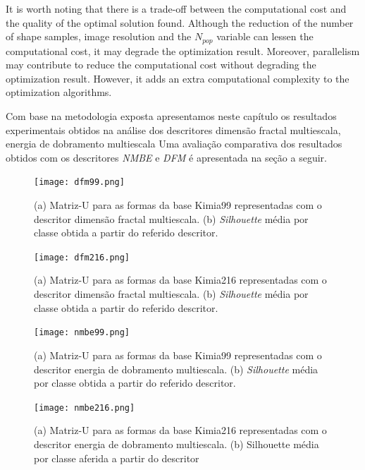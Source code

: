 {It is worth noting that there is a trade-off between the computational cost and the quality of the optimal solution found. Although the reduction of the number of shape samples, image resolution and the $N_{pop}$ variable can lessen the computational cost, it may degrade the optimization result. Moreover, parallelism may contribute to reduce the computational cost without degrading the optimization result.  However, it adds an extra computational complexity to the optimization algorithms.
}





Com base na metodologia exposta apresentamos neste capítulo os resultados experimentais obtidos na análise dos descritores dimensão fractal multiescala, energia de dobramento multiescala Uma avaliação comparativa dos resultados obtidos com os descritores \emph{NMBE} e \emph{DFM} é apresentada na seção a seguir.

\begin{figure}
 \caption{\label{fig:dfm99} (a) Matriz-U para as formas da base Kimia99 representadas com o descritor dimensão fractal multiescala. (b) \textit{Silhouette} média por classe obtida a partir do referido descritor.}
  \centering
  \texttt{[image: dfm99.png]}
\end{figure}

\begin{figure}
 \caption{\label{fig:dfm216} (a) Matriz-U para as formas da base Kimia216 representadas com o descritor dimensão fractal multiescala. (b) \textit{Silhouette} média por classe obtida a partir do referido descritor.}
  \centering
  \texttt{[image: dfm216.png]}
\end{figure}

\begin{figure}
 \caption{\label{fig:nmbe99} (a) Matriz-U para as formas da base Kimia99 representadas com o descritor energia de dobramento multiescala. (b) \textit{Silhouette }média por classe obtida a partir do referido descritor.}
  \centering
  \texttt{[image: nmbe99.png]}
\end{figure}

\begin{figure}
 \caption{\label{fig:nmbe216} (a) Matriz-U para as formas da base Kimia216 representadas com o descritor energia de dobramento multiescala. (b) Silhouette média por classe aferida a partir do descritor}
  \centering
  \texttt{[image: nmbe216.png]}
\end{figure}


